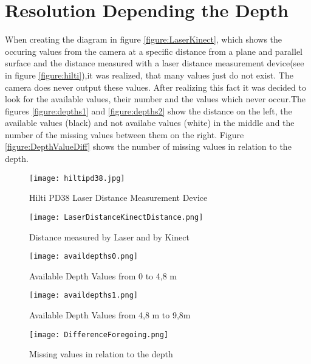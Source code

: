 \section{Resolution Depending the Depth} \label{resdepDepth}
When creating the diagram in figure \vref{figure:LaserKinect}, which shows the occuring values from the camera 
at a specific distance from a plane and parallel surface and the distance measured with a laser distance measurement 
device(see in figure \vref{figure:hilti}),it was realized, that many values just do not exist. The camera does never output 
these values. After realizing this fact it was decided to look for the available values, their number and the values which 
never occur.The figures \vref{figure:depths1} and \vref{figure:depths2} show the distance on the left, 
the available values (black) and not availabe values (white) in the middle and the number of the missing values between them 
on the right. Figure \vref{figure:DepthValueDiff} shows the number of missing values in relation to the depth.

\begin{figure}[htp]
\begin{center}
  \texttt{[image: hiltipd38.jpg]}
  \caption{Hilti PD38 Laser Distance Measurement Device}
  \label{figure:hilti}
\end{center}
\end{figure}
\begin{figure}[htp]

\begin{center}
  \texttt{[image: LaserDistanceKinectDistance.png]}
  \caption{Distance measured by Laser and by Kinect}
  \label{figure:LaserKinect}
\end{center}
\end{figure}

\begin{figure}[htp]
\begin{center}
  \texttt{[image: availdepths0.png]}
  \caption{Available Depth Values from 0 to 4,8 m}
  \label{figure:depths1}
\end{center}
\end{figure}

\begin{figure}[htp]
\begin{center}
  \texttt{[image: availdepths1.png]}
  \caption{Available Depth Values from 4,8 m to 9,8m}
  \label{figure:depths2}
\end{center}
\end{figure}

\begin{figure}[htp]
\begin{center}
  \texttt{[image: DifferenceForegoing.png]}
  \caption{Missing values in relation to the depth}
  \label{figure:DepthValueDiff}
\end{center}
\end{figure}

